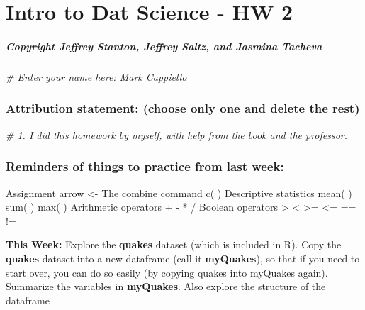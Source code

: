 \documentclass[
]{article}
\author{}
\date{\vspace{-2.5em}}
\newenvironment{Shaded}{\begin{snugshade}}{\end{snugshade}}
\newcommand{\CommentTok}[1]{\textcolor[rgb]{0.56,0.35,0.01}{\textit{#1}}}
\begin{document}
\hypertarget{intro-to-dat-science---hw-2}{%
\section{Intro to Dat Science - HW
2}\label{intro-to-dat-science---hw-2}}

\hypertarget{copyright-jeffrey-stanton-jeffrey-saltz-and-jasmina-tacheva}{%
\subparagraph{Copyright Jeffrey Stanton, Jeffrey Saltz, and Jasmina
Tacheva}\label{copyright-jeffrey-stanton-jeffrey-saltz-and-jasmina-tacheva}}

\begin{Shaded}
\begin{Highlighting}[]
\CommentTok{\# Enter your name here: Mark Cappiello}
\end{Highlighting}
\end{Shaded}

\hypertarget{attribution-statement-choose-only-one-and-delete-the-rest}{%
\subsubsection{Attribution statement: (choose only one and delete the
rest)}\label{attribution-statement-choose-only-one-and-delete-the-rest}}

\begin{Shaded}
\begin{Highlighting}[]
\CommentTok{\# 1. I did this homework by myself, with help from the book and the professor.}
\end{Highlighting}
\end{Shaded}

\hypertarget{reminders-of-things-to-practice-from-last-week}{%
\subsubsection{Reminders of things to practice from last
week:}\label{reminders-of-things-to-practice-from-last-week}}

Assignment arrow \textless- The combine command c( ) Descriptive
statistics mean( ) sum( ) max( ) Arithmetic operators + - * / Boolean
operators \textgreater{} \textless{} \textgreater= \textless= == !=

\textbf{This Week:} Explore the \textbf{quakes} dataset (which is
included in R). Copy the \textbf{quakes} dataset into a new dataframe
(call it \textbf{myQuakes}), so that if you need to start over, you can
do so easily (by copying quakes into myQuakes again). Summarize the
variables in \textbf{myQuakes}. Also explore the structure of the
dataframe
\end{document}
